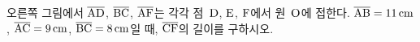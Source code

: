 \noindent\begin{minipage}[t]{0.58\linewidth}\vspace{0pt}\raggedright 오른쪽 그림에서 $\overline{\mathrm{AD}}$, $\overline{\mathrm{BC}}$, $\overline{\mathrm{AF}}$는 각각 점~$\mathrm{D}$, $\mathrm{E}$, $\mathrm{F}$에서 원~$\mathrm{O}$에 접한다. $\overline{\mathrm{AB}}=11\,\mathrm{cm}$, $\overline{\mathrm{AC}}=9\,\mathrm{cm}$, $\overline{\mathrm{BC}}=8\,\mathrm{cm}$일 때, $\overline{\mathrm{CF}}$의 길이를 구하시오.\end{minipage}\hfill\begin{minipage}[t]{0.4\linewidth}\vspace{0pt}\centering \resizebox{\ifdim\width>\linewidth\linewidth\else\width\fi}{!}{}\end{minipage}\par
